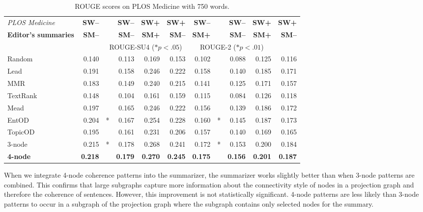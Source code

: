 \begin{table}[!ht]
	\begin{center}
		\begin{tabular}{lr@{}lrrr||r@{}lrrr}
		\toprule
		\emph{PLOS Medicine}& \textbf{SW--}& & \textbf{SW--} & \textbf{SW+} & \textbf{SW+}& \textbf{SW--} & & \textbf{SW--} & \textbf{SW+} & \textbf{SW+} \\
		\textbf{Editor's summaries}  & \textbf{SM--} & & \textbf{SM--} &  \textbf{SM+} & \textbf{SM--} &  \textbf{SM+}  & & \textbf{SM--} &  \textbf{SM+}  & \textbf{SM--} \\
		\midrule
		&& \multicolumn{4}{c||}{ROUGE-SU4 ($\ast p<.05$)} & \multicolumn{4}{c}{ROUGE-2 ($\ast p<.01$)}\\
		\midrule
		Random &  0.140& & 0.113 & 0.169  & 0.153 &  0.102 & & 0.088 & 0.125 & 0.116 \\
		Lead & 0.191 & & 0.158 & 0.246 & 0.222  & 0.158 & & 0.140 &0.185 &0.171   \\
		MMR & 0.183& & 0.149 & 0.240 & 0.215 & 0.141 & & 0.125 & 0.171 &0.157 \\
		TextRank & 0.148& & 0.104 & 0.161 & 0.159 & 0.115 & & 0.084 &0.126 & 0.118\\
		Mead & 0.197 & & 0.165 & 0.246 & 0.222& 0.156 & &0.139 & 0.186 & 0.172 \\
		EntOD & 0.204&* & 0.167 & 0.254& 0.228 &0.160 &* & 0.145 &0.187 & 0.173\\
		TopicOD & 0.195 & &0.161 & 0.231 &0.206 & 0.157 &  & 0.140 &0.169 & 0.165 \\
		3-node &0.215& * &0.178& 0.268& 0.241& 0.172 & * & 0.153 & 0.200 &0.184 \\
		\textbf{4-node} & \textbf{0.218}& & \textbf{0.179} & \textbf{0.270} & \textbf{0.245}  & \textbf{0.175} & & \textbf{0.156} & \textbf{0.201} & \textbf{0.187} \\
		\bottomrule
		\end{tabular}
	\end{center}
	\caption{ROUGE scores on PLOS Medicine with 750 words.}
	\label{tab:plos-750words}
\end{table}

When we integrate 4-node coherence patterns into the summarizer, the summarizer works slightly better than when 3-node patterns are combined. 
This confirms that large subgraphs capture more information about the connectivity style of nodes in a projection graph and therefore the coherence of sentences.  
However, this improvement is not statistically significant. 
4-node patterns are less likely than 3-node patterns to occur in a subgraph of the projection graph where the subgraph contains only selected nodes for the summary. 

